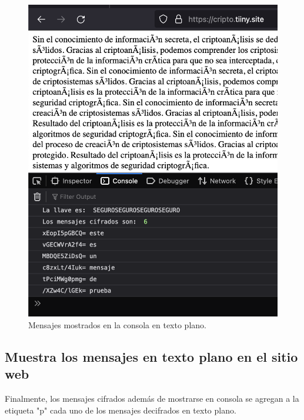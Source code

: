 \documentclass[letter,12pt]{article}
\begin{document}
\begin{figure}[H]
  \centering
  \includegraphics[width=13cm]{images/03-all-msgs.png}
  \caption{Mensajes mostrados en la consola en texto plano.}
\end{figure}

\subsection{Muestra los mensajes en texto plano en el sitio web}
Finalmente, los mensajes cifrados además de mostrarse en consola se agregan a la etiqueta "p" cada uno de los mensajes decifrados en texto plano.
\end{document}
